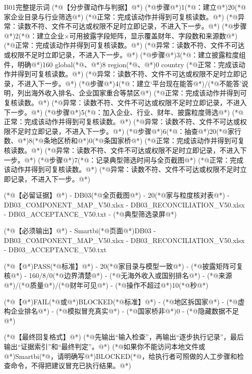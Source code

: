 \documentclass[UTF8,openany,zihao=-4]{ctexbook}
\renewcommand{\_}{\textunderscore\allowbreak}
\begin{document}
\begin{PromptBox}{B01完整提示词}
(*@{\promptcjk 【分步骤动作与判据】}@*)
(*@{\promptcjk 步骤}@*)1(*@{\promptcjk ：建立}@*)20(*@{\promptcjk 家企业目录与行业筛选}@*)
  (*@{\promptcjk 正常：完成该动作并得到可复核读数。}@*)
  (*@{\promptcjk 异常：读数不符、文件不可达或权限不足时立即记录，不进入下一步。}@*)
(*@{\promptcjk 步骤}@*)2(*@{\promptcjk ：建立企业×可用披露字段矩阵，显示覆盖财年、字段数和来源数}@*)
  (*@{\promptcjk 正常：完成该动作并得到可复核读数。}@*)
  (*@{\promptcjk 异常：读数不符、文件不可达或权限不足时立即记录，不进入下一步。}@*)
(*@{\promptcjk 步骤}@*)3(*@{\promptcjk ：建立披露粒度组件，明确}@*)160 global(*@{\promptcjk 、}@*)8 region(*@{\promptcjk 、}@*)0 country
  (*@{\promptcjk 正常：完成该动作并得到可复核读数。}@*)
  (*@{\promptcjk 异常：读数不符、文件不可达或权限不足时立即记录，不进入下一步。}@*)
(*@{\promptcjk 步骤}@*)4(*@{\promptcjk ：建立‘平台现在能答}@*)/(*@{\promptcjk 不能答’说明，列出海外收入排名、企业国家重合等禁区}@*)
  (*@{\promptcjk 正常：完成该动作并得到可复核读数。}@*)
  (*@{\promptcjk 异常：读数不符、文件不可达或权限不足时立即记录，不进入下一步。}@*)
(*@{\promptcjk 步骤}@*)5(*@{\promptcjk ：加入企业、行业、财年、披露粒度筛选}@*)
  (*@{\promptcjk 正常：完成该动作并得到可复核读数。}@*)
  (*@{\promptcjk 异常：读数不符、文件不可达或权限不足时立即记录，不进入下一步。}@*)
(*@{\promptcjk 步骤}@*)6(*@{\promptcjk ：抽查}@*)20(*@{\promptcjk 家行数、}@*)8(*@{\promptcjk 条地区桥和}@*)0(*@{\promptcjk 条国家桥}@*)
  (*@{\promptcjk 正常：完成该动作并得到可复核读数。}@*)
  (*@{\promptcjk 异常：读数不符、文件不可达或权限不足时立即记录，不进入下一步。}@*)
(*@{\promptcjk 步骤}@*)7(*@{\promptcjk ：记录典型筛选时间与全页截图}@*)
  (*@{\promptcjk 正常：完成该动作并得到可复核读数。}@*)
  (*@{\promptcjk 异常：读数不符、文件不可达或权限不足时立即记录，不进入下一步。}@*)

(*@{\promptcjk 【必留证据】}@*)
- DB03(*@{\promptcjk 全页截图}@*)
- 20(*@{\promptcjk 家与粒度核对表}@*)
- DB03_COMPONENT_MAP_V50.xlsx
- DB03_RECONCILIATION_V50.xlsx
- DB03_ACCEPTANCE_V50.txt
- (*@{\promptcjk 典型筛选录屏}@*)

(*@{\promptcjk 【必须输出】}@*)
- Smartbi(*@{\promptcjk 页面}@*)DB03
- DB03_COMPONENT_MAP_V50.xlsx
- DB03_RECONCILIATION_V50.xlsx
- DB03_ACCEPTANCE_V50.txt

(*@{\promptcjk 【}@*)PASS(*@{\promptcjk 标准】}@*)
- 20(*@{\promptcjk 家目录与模型一致}@*)
- (*@{\promptcjk 披露矩阵可复核}@*)
- 160/8/0(*@{\promptcjk 边界清楚}@*)
- (*@{\promptcjk 无海外收入或国别排名}@*)
- (*@{\promptcjk 来源}@*)/(*@{\promptcjk 质量}@*)/(*@{\promptcjk 财年可见}@*)
- (*@{\promptcjk 操作不超过}@*)10(*@{\promptcjk 秒}@*)

(*@{\promptcjk 【}@*)FAIL(*@{\promptcjk 或}@*)BLOCKED(*@{\promptcjk 标准】}@*)
- (*@{\promptcjk 地区拆国家}@*)
- (*@{\promptcjk 虚构企业排名}@*)
- (*@{\promptcjk 模拟冒充真实}@*)
- (*@{\promptcjk 国家桥非}@*)0
- (*@{\promptcjk 隐藏数据不足}@*)

(*@{\promptcjk 【最终回复格式】}@*)
(*@{\promptcjk 先输出“输入检查”，再输出“逐步执行记录”，最后输出“证据索引”和“最终判定”。}@*)
(*@{\promptcjk 如果你不能访问本地文件或}@*)Smartbi(*@{\promptcjk ，请明确写}@*)BLOCKED(*@{\promptcjk ，给执行者可照做的人工步骤和检查命令，不得把建议冒充已执行结果。}@*)
\end{PromptBox}
\end{document}
